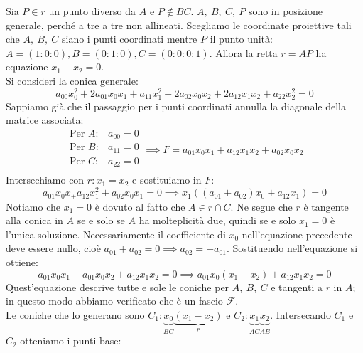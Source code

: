 \begin{demonstration}
	Sia $P\in r$ un punto diverso da $A$ e $P\notin\overline{BC}$. $A,\ B,\ C,\ P$ sono in posizione generale, perché a tre a tre non allineati. Scegliamo le coordinate proiettive tali che $A,\ B,\ C$ siano i punti coordinati mentre $P$ il punto unità: $A=(1\colon 0\colon 0),B=(0\colon 1\colon 0),C=(0\colon 0\colon 0\colon1)$.
	Allora la retta $r=\overline{AP}$ ha equazione $x_1-x_2=0$.\\
	Si consideri la conica generale:
	\begin{equation*}
		a_{00}x_0^2+2a_{01}x_0x_1+a_{11}x_1^2+2a_{02}x_0x_2+2a_{12}x_1x_2+a_{22}x_2^2=0
	\end{equation*}
	Sappiamo già che il passaggio per i punti coordinati annulla la diagonale della matrice associata:
	\begin{equation*}
		\begin{array}{ll}
			\text{Per } A \colon & a_{00}=0 \\
			\text{Per } B \colon & a_{11}=0 \\
			\text{Per } C \colon & a_{22}=0 \\
		\end{array}
	\implies F=a_{01}x_0x_1+a_{12}x_1x_2+a_{02}x_0x_2
	\end{equation*}
	Intersechiamo con $r\colon x_1=x_2$ e sostituiamo in $F$:
	\begin{equation*}
		a_{01}x_0x_+a_{12}x_1^2+a_{02}x_0x_1=0\implies x_1((a_{01}+a_{02})x_0+a_{12}x_1)=0
	\end{equation*}
	Notiamo che $x_1=0$ è dovuto al fatto che $A\in r\cap C$. Ne segue che $r$ è tangente alla conica in $A$ se e solo se $A$ ha molteplicità due, quindi se e solo $x_1=0$ è l'unica soluzione. Necessariamente il coefficiente di $x_0$ nell'equazione precedente deve essere nullo, cioè $a_{01}+a_{02}=0\implies a_{02}=-a_{01}$. Sostituendo nell'equazione si ottiene:
		\begin{equation*}
			a_{01}x_0x_1 -a_{01}x_0x_2 + a_{12}x_1x_2=0 \implies a_{01}x_0(x_1-x_2) + a_{12}x_1x_2=0
		\end{equation*}
	Quest'equazione descrive tutte e sole le coniche per $A,\ B,\ C$ e tangenti a $r$ in $A$; in questo modo abbiamo verificato che è un fascio $\mathcal{F}$.\\
	Le coniche che lo generano sono $C_1\colon \underbrace{x_0}_{\overline{BC}} \underbrace{(x_1-x_2)}_{r}$ e $C_2\colon \underbrace{x_1}_{\overline{AC}} \underbrace{x_2}_{\overline{AB}}$. Intersecando $C_1$ e $C_2$ otteniamo i punti base:

\end{demonstration}

